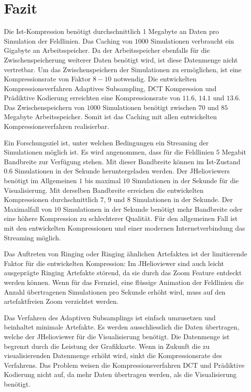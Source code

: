 \section{Fazit}
Die Ist-Kompression benötigt durchschnittlich 1 Megabyte an Daten pro Simulation der Feldlinien. Das Caching von $1000$ Simulationen verbraucht ein Gigabyte an Arbeitsspeicher. Da der Arbeitsspeicher ebenfalls für die Zwischenspeicherung weiterer Daten benötigt wird, ist diese Datenmenge nicht vertretbar. Um das Zwischenspeichern der Simulationen zu ermöglichen, ist eine Kompressionsrate von Faktor $8-10$ notwendig. Die entwickelten Kompressionsverfahren Adaptives Subsampling, DCT Kompression und Prädiktive Kodierung erreichten eine Kompressionsrate von $11.6$, $14.1$ und $13.6$. Das Zwischenspeichern von $1000$ Simulationen benötigt zwischen $70$ und $85$ Megabyte Arbeitsspeicher. Somit ist das Caching mit allen entwickelten Kompressionsverfahren realisierbar.

Ein Forschungsziel ist, unter welchen Bedingungen ein Streaming der Simulationen möglich ist. Es wird angenommen, dass für die Feldlinien $5$ Megabit Bandbreite zur Verfügung stehen. Mit dieser Bandbreite können im Ist-Zustand $0.6$ Simulationen in der Sekunde heruntergeladen werden. Der JHelioviewers benötigt im Allgemeinen $1$ bis maximal $10$ Simulationen in der Sekunde für die Visualisierung. Mit derselben Bandbreite erreichen die entwickelten Kompressionen durchschnittlich $7$, $9$ und $8$ Simulationen in der Sekunde. Der Maximalfall von $10$ Simulationen in der Sekunde benötigt mehr Bandbreite oder eine höhere Kompression zu schlechterer Qualität. Für den allgemeinen Fall ist mit den entwickelten Kompressionen und einer modernen Internetverbindung das Streaming möglich. 

Das Auftreten von Ringing oder Ringing ähnlichen Artefakten ist der limitierende Faktor für die entwickelten Kompression: Im JHelioviewer sind auch leicht ausgeprägte Ringing Artefakte störend, da sie durch das Zoom Feature entdeckt werden können. Wenn für das Fernziel, eine flüssige Animation der Feldlinien die Anzahl übertragenen Simulationen pro Sekunde erhöht wird, muss auf den artefaktfreien Zoom verzichtet werden.

Das Verfahren des Adaptiven Subsamplings ist einfach umzusetzen und beinhaltet minimale Artefakte. Es werden ausschliesslich die Daten übertragen, welche der JHelioviewer für die Visualisierung benötigt. Die Datenmenge ist begrenzt durch die Leistung der Grafikkarte. Wenn in Zukunft die zu visualisierenden Datenmenge erhöht wird, sinkt die Kompressionsrate des Verfahrens. Das Problem weisen die Kompressionsverfahren DCT und Prädiktive Kodierung nicht auf, da mehr Daten übertragen werden, als die Visualisierung benötigt.

